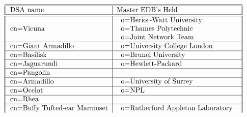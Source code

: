 \begin{table}
\caption{DSAs at the c=GB Level}
\small
\[
\begin{tabular}{||l|l||} \hline\hline
DSA name 		& Master EDB's Held \\ \hline\hline	
cn=Vicuna
           &\begin{tabular}{l}
           o=Heriot-Watt University \\
           o=Thames Polytechnic \\
           o=Joint Network Team \\
           \end{tabular}\\ \hline
cn=Giant Armadillo
           &\begin{tabular}{l}
           o=University College London \\
           \end{tabular}\\ \hline
cn=Basilisk
           &\begin{tabular}{l}
           o=Brunel University \\
           \end{tabular}\\ \hline
cn=Jaguarundi
           &\begin{tabular}{l}
           o=Hewlett-Packard \\
           \end{tabular}\\ \hline
cn=Pangolin
           &\begin{tabular}{l}
           \end{tabular}\\ \hline
cn=Armadillo
           &\begin{tabular}{l}
           o=University of Surrey \\
           \end{tabular}\\ \hline
cn=Ocelot
           &\begin{tabular}{l}
           o=NPL \\
           \end{tabular}\\ \hline
cn=Rhea
           &\begin{tabular}{l}
           \end{tabular}\\ \hline
cn=Buffy Tufted-ear Marmoset
           &\begin{tabular}{l}
           o=Rutherford Appleton Laboratory \\

\end{tabular}
\end{tabular}\]
\end{table}
